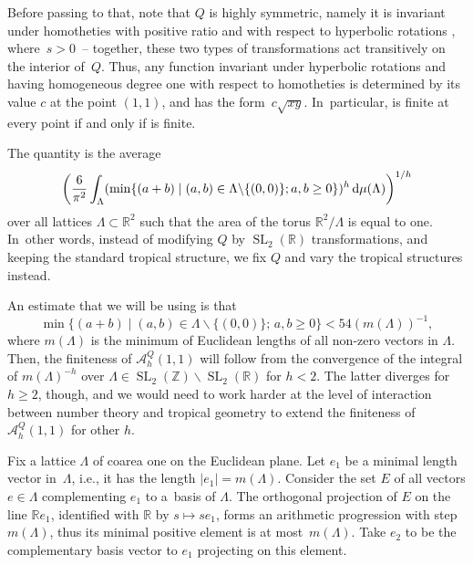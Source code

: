 \documentclass[pdftex]{sigma}
\numberwithin{equation}{section}
\theoremstyle{definition}
\begin{document}
Before passing to that, note that $Q$ is highly symmetric, namely it is invariant under homotheties with positive ratio and with respect to hyperbolic rotations , where~${s>0}$~-- together, these two types of transformations act transitively on the interior of~$Q$. Thus, any function invariant under hyperbolic rotations and having homogeneous degree one with respect to homotheties is determined by its value $c$ at the point $(1,1)$, and has the form~$c\sqrt{xy}$. In~particular,  is finite at every point if and only if  is finite.

The quantity  is the average
\[
\biggl(\frac{6}{\pi^2}\int_{\Lambda}(\min\{(a+b)\mid (a,b)\in\Lambda\backslash\{(0,0)\}; a,b\geq 0\})^h\, {\rm d}\mu(\Lambda)\biggr)^{1/h}
\]
over all lattices $\Lambda\subset\mathbb{R}^2$ such that the area of the torus $\mathbb{R}^2\slash\Lambda$ is equal to one. In~other words, instead of modifying $Q$ by $\operatorname{SL}_2(\mathbb{R})$ transformations, and keeping the standard tropical structure, we fix $Q$ and vary the tropical structures instead.

An estimate that we will be using is that \begin{equation}\tag{$\star$}\label{eq_star}
\min\{(a+b) \mid (a,b)\in\Lambda\backslash\{(0,0)\};\, a,b\geq 0\}<54(m(\Lambda))^{-1},\end{equation}
where $m(\Lambda)$ is the minimum of Euclidean lengths of all non-zero vectors in $\Lambda$. Then, the finiteness of $\mathcal{A}^Q_h(1,1)$ will follow from the convergence of the integral of $ m(\Lambda)^{-h}$ over $\Lambda\in\operatorname{SL}_2(\mathbb{Z})\backslash\operatorname{SL}_2(\mathbb{R})$ for $h<2$. The latter diverges for $h\geq 2$, though, and we would need to work harder at the level of interaction between number theory and tropical geometry to extend the finiteness of $\mathcal{A}^Q_h(1,1)$ for other $h$.

Fix a lattice $\Lambda$ of coarea one on the Euclidean plane. Let $e_1$ be a minimal length vector in~$\Lambda$, i.e., it has the length $|e_1|=m(\Lambda)$. Consider the set $E$ of all vectors $e\in\Lambda$ complementing $e_1$ to a~basis of $\Lambda$. The orthogonal projection of $E$ on the line $\mathbb{R}e_1$, identified with $\mathbb{R}$ by $s\mapsto s e_1$, forms an arithmetic progression with step~$m(\Lambda)$, thus its minimal positive element is at most~$m(\Lambda)$. Take $e_2$ to be the complementary basis vector to $e_1$ projecting on this element.
\end{document}
